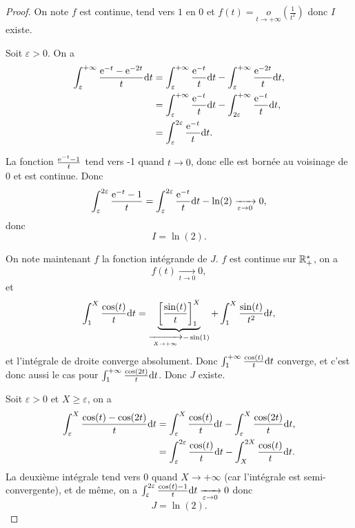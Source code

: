 \documentclass[12pt]{article}
\begin{document}
\begin{proof}
    On note 
    $f$ est continue, tend vers $1$ en 0 et $f(t)=\underset{t\to+\infty}{o}\left(\frac{1}{t^{2}}\right)$ donc $I$ existe.

    Soit $\varepsilon>0$. On a 
    \begin{align*}
        \int_{\varepsilon}^{+\infty}\frac{\mathrm{e}^{-t}-\mathrm{e}^{-2t}}{t}\mathrm{d} t
        &=\int_{\varepsilon}^{+\infty}\frac{\mathrm{e}^{-t}}{t}\mathrm{d} t-\int_{\varepsilon}^{+\infty}\frac{\mathrm{e}^{-2t}}{t}\mathrm{d} t,\\
        &=\int_{\varepsilon}^{+\infty}\frac{\mathrm{e}^{-t}}{t}\mathrm{d} t-\int_{2\varepsilon}^{+\infty}\frac{\mathrm{e}^{-t}}{t}\mathrm{d} t,\\
        &=\int_{\varepsilon}^{2\varepsilon}\frac{\mathrm{e}^{-t}}{t}\mathrm{d} t.
    \end{align*}

    La fonction $\frac{\mathrm{e}^{-t}-1}{t}$ tend vers -1 quand $t\to0$, donc elle est bornée au voisinage de 0 et est continue. Donc 
    \begin{equation*}
        \int_{\varepsilon}^{2\varepsilon}\frac{\mathrm{e}^{-t}-1}{t}=\int_{\varepsilon}^{2\varepsilon}\frac{\mathrm{e}^{-t}}{t}\mathrm{d} t-\ln(2)\xrightarrow[\varepsilon\to0]{}0,
    \end{equation*}
    donc 
    \begin{equation*}
        \boxed{
            I=\ln(2).
        }
    \end{equation*}

    On note maintenant $f$ la fonction intégrande de $J$. $f$ est continue sur $\mathbb{R}_{+}^{*}$, on a 
    \begin{equation*}
        f(t)\xrightarrow[t\to0]{}0,    
    \end{equation*}
    et 
    \begin{equation*}
        \int_{1}^{X}\frac{\cos(t)}{t}\mathrm{d} t=\underbrace{\left[\frac{\sin(t)}{t}\right]_{1}^{X}}_{\xrightarrow[X\to+\infty]{}-\sin(1)}+\int_{1}^{X}\frac{\sin(t)}{t^{2}}\mathrm{d} t,
    \end{equation*}
    et l'intégrale de droite converge absolument. Donc $\int_{1}^{+\infty}\frac{\cos(t)}{t}\mathrm{d} t$ converge, et c'est donc aussi le cas pour $\int_{1}^{+\infty}\frac{\cos(2t)}{t}\mathrm{d} t$. Donc $J$ existe.

    Soit $\varepsilon>0$ et $X\geqslant \varepsilon$, on a 
    \begin{align*}
        \int_{\varepsilon}^{X}\frac{\cos(t)-\cos(2t)}{t}\mathrm{d} t
        &=\int_{\varepsilon}^{X}\frac{\cos(t)}{t}\mathrm{d} t-\int_{\varepsilon}^{X}\frac{\cos(2t)}{t}\mathrm{d} t,\\
        &=\int_{\varepsilon}^{2\varepsilon}\frac{\cos(t)}{t}\mathrm{d} t-\int_{X}^{2X}\frac{\cos(t)}{t}\mathrm{d} t.
    \end{align*}
    La deuxième intégrale tend vers 0 quand $X\to+\infty$ (car l'intégrale est semi-convergente), et de même, on a $\int_{\varepsilon}^{2\varepsilon}\frac{\cos(t)-1}{t}\mathrm{d} t\xrightarrow[\varepsilon\to0]{}0$ donc 
    \begin{equation*}
        \boxed{
            J=\ln(2).
        }
    \end{equation*}
\end{proof}
\end{document}
